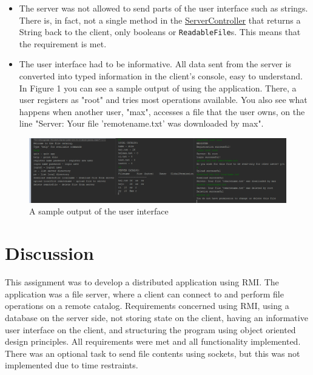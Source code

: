 \documentclass[a4paper]{scrartcl}
\def\code#1{\texttt{#1}}
\begin{document}
\begin{itemize}
    \item The server was not allowed to send parts of the user interface such as strings. There is, in fact, not a single method in the \href{https://github.com/fongie/Filehandler/blob/master/filehandler_server/src/main/java/controller/ServerController.java}{ServerController} that returns a String back to the client, only booleans or \code{ReadableFile}s. This means that the requirement is met.

    \item The user interface had to be informative. All data sent from the server is converted into typed information in the client's console, easy to understand. In Figure 1 you can see a sample output of using the application. There, a user registers as "root" and tries most operations available. You also see what happens when another user, "max", accesses a file that the user owns, on the line "Server: Your file 'remotename.txt' was downloaded by max".

\end{itemize}

\begin{figure}[h!]
    \begin{center}
        \includegraphics[scale=0.52]{ui.png}
        \caption{A sample output of the user interface}
        \label{fig:ui}
    \end{center}
\end{figure}



\section{Discussion}

This assignment was to develop a distributed application using RMI. The application was a file server, where a client can connect to and perform file operations on a remote catalog. Requirements concerned using RMI, using a database on the server side, not storing state on the client, having an informative user interface on the client, and structuring the program using object oriented design principles. All requirements were met and all functionality implemented. There was an optional task to send file contents using sockets, but this was not implemented due to time restraints.
\end{document}
